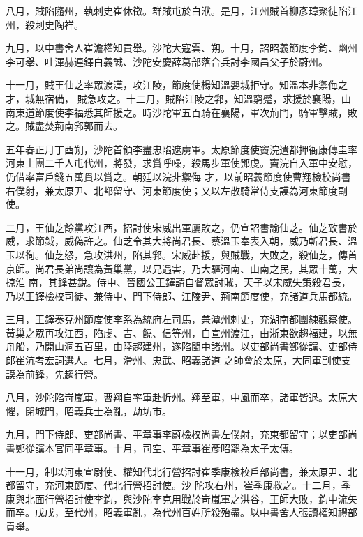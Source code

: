\begin{pinyinscope}
 八月，賊陷隨州，執刺史崔休徵。群賊屯於白洑。是月，江州賊首柳彥璋聚徒陷江州，殺刺史陶祥。



 九月，以中書舍人崔澹權知貢舉。沙陀大寇雲、朔。十月，詔昭義節度李鈞、幽州李可舉、吐渾赫連鐸白義誠、沙陀安慶薛葛部落合兵討李國昌父子於蔚州。



 十一月，賊王仙芝率眾渡漢，攻江陵，節度使楊知溫嬰城拒守。知溫本非禦侮之才，城無宿備，
 賊急攻之。十二月，賊陷江陵之郛，知溫窮蹙，求援於襄陽，山南東道節度使李福悉其師援之。時沙陀軍五百騎在襄陽，軍次荊門，騎軍擊賊，敗之。賊盡焚荊南郛郭而去。



 五年春正月丁酉朔，沙陀首領李盡忠陷遮虜軍。太原節度使竇浣遣都押衙康傳圭率河東土團二千人屯代州，將發，求賞呼噪，殺馬步軍使鄧虔。竇浣自入軍中安慰，仍借率富戶錢五萬貫以賞之。朝廷以浣非禦侮
 才，以前昭義節度使曹翔檢校尚書右僕射，兼太原尹、北都留守、河東節度使；又以左散騎常侍支謨為河東節度副使。



 二月，王仙芝餘黨攻江西，招討使宋威出軍屢敗之，仍宣詔書諭仙芝。仙芝致書於威，求節鉞，威偽許之。仙芝令其大將尚君長、蔡溫玉奉表入朝，威乃斬君長、溫玉以徇。仙芝怒，急攻洪州，陷其郛。宋威赴援，與賊戰，大敗之，殺仙芝，傳首京師。尚君長弟尚讓為黃巢黨，以兄遇害，乃大驅河南、山南之民，其眾十萬，大掠淮
 南，其鋒甚銳。侍中、晉國公王鐸請自督眾討賊，天子以宋威失策殺君長，乃以王鐸檢校司徒、兼侍中、門下侍郎、江陵尹、荊南節度使，充諸道兵馬都統。



 三月，王鐸奏兗州節度使李系為統府左司馬，兼潭州刺史，充湖南都團練觀察使。黃巢之眾再攻江西，陷虔、吉、饒、信等州，自宣州渡江，由浙東欲趨福建，以無舟船，乃開山洞五百里，由陸趨建州，遂陷閩中諸州。以吏部尚書鄭從讜、吏部侍郎崔沆考宏詞選人。七月，滑州、忠武、昭義諸道
 之師會於太原，大同軍副使支謨為前鋒，先趨行營。



 八月，沙陀陷岢嵐軍，曹翔自率軍赴忻州。翔至軍，中風而卒，諸軍皆退。太原大懼，閉城門，昭義兵士為亂，劫坊市。



 九月，門下侍郎、吏部尚書、平章事李蔚檢校尚書左僕射，充東都留守；以吏部尚書鄭從讜本官同平章事。十月，司空、平章事崔彥昭罷為太子太傅。



 十一月，制以河東宣尉使、權知代北行營招討崔季康檢校戶部尚書，兼太原尹、北都留守，充河東節度、代北行營招討使。沙
 陀攻右州，崔季康救之。十二月，季康與北面行營招討使李鈞，與沙陀李克用戰於岢嵐軍之洪谷，王師大敗，鈞中流矢而卒。戊戌，至代州，昭義軍亂，為代州百姓所殺殆盡。以中書舍人張讀權知禮部貢舉。




\end{pinyinscope}
